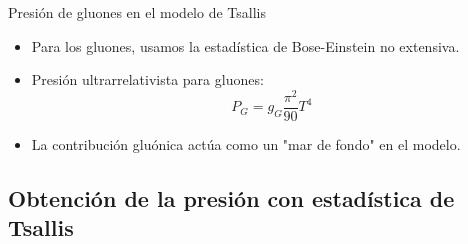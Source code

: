 \documentclass{beamer}
\begin{document}
\begin{frame}{Presión de gluones en el modelo de Tsallis}
  \begin{itemize}
    \item Para los gluones, usamos la estadística de Bose-Einstein no extensiva.
    \item Presión ultrarrelativista para gluones:
    \[
    P_G = g_G \frac{\pi^2}{90} T^4
    \]
    \item La contribución gluónica actúa como un "mar de fondo" en el modelo.
  \end{itemize}
\end{frame}

\subsection{Obtención de la presión con estadística de Tsallis}
\end{document}
